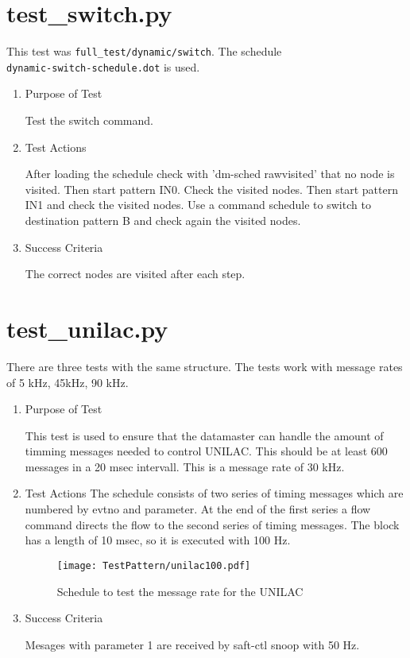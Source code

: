 \documentclass[12pt,a4paper]{report}
\begin{document}
\section{test\_switch.py}
This test was \texttt{full\_test/dynamic/switch}. The schedule \\
\texttt{dynamic-switch-schedule.dot} is used.
\begin{enumerate}
  \item Purpose of Test

  Test the switch command.
  \item Test Actions

  After loading the schedule check with 'dm-sched rawvisited' that no node
  is visited. Then start pattern IN0. Check the visited nodes. Then start
  pattern IN1 and check the visited nodes. Use a command schedule to
  switch to destination pattern B and check again the visited nodes.
  \item Success Criteria

  The correct nodes are visited after each step.
\end{enumerate}

\section{test\_unilac.py}
There are three tests with the same structure. The tests work with message rates of
5 kHz, 45kHz, 90 kHz.
\begin{enumerate}
  \item Purpose of Test

  This test is used to ensure that the datamaster can handle the amount of timming messages
  needed to control UNILAC. This should be at least 600 messages in a 20 msec intervall. This
  is a message rate of 30 kHz.
  \item Test Actions
  The schedule consists of two series of timing messages which are numbered by evtno and parameter.
  At the end of the first series a flow command directs the flow to the second series of timing messages.
  The block has a length of 10 msec, so it is executed with 100 Hz.
    \begin{figure}
        \centering
        \texttt{[image: TestPattern/unilac100.pdf]}
        \caption{Schedule to test the message rate for the UNILAC}
        \label{fig:unilac100}
    \end{figure}
  \item Success Criteria

  Mesages with parameter 1 are received by saft-ctl snoop with 50 Hz.
\end{enumerate}
\end{document}
